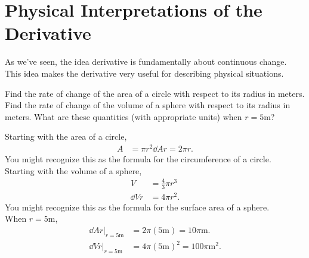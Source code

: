\section{Physical Interpretations of the Derivative}
As we've seen, the idea derivative is fundamentally about continuous change.
This idea makes the derivative very useful for describing physical situations.

\begin{example}
		Find the rate of change of the area of a circle with respect to its radius in meters.
		Find the rate of change of the volume of a sphere with respect to its radius in meters.
		What are these quantities (with appropriate units) when $r=5\text{m}$?
\end{example}
Starting with the area of a circle,
\begin{align*}
	A &= \pi r^2
	\dd{A}{r} = 2\pi r.
\end{align*}
\indent
You might recognize this as the formula for the circumference of a circle.\\
\indent
Starting with the volume of a sphere,
\begin{align*}
	V &= \frac{4}{3}\pi r^3 \\
	\dd{V}{r} &= 4\pi r^2.
\end{align*}
\indent
You might recognize this as the formula for the surface area of a sphere.\\
\indent
When $r=5\text{m}$,
\begin{align*}
	\dd{A}{r}\biggr\rvert_{r=5\text{m}} &= 2\pi\left(5\text{m}\right) = 10\pi\text{m}. \\
	\dd{V}{r}\biggr\rvert_{r=5\text{m}} &= 4\pi\left(5\text{m}\right)^2 = 100\pi\text{m}^2.
\end{align*}

